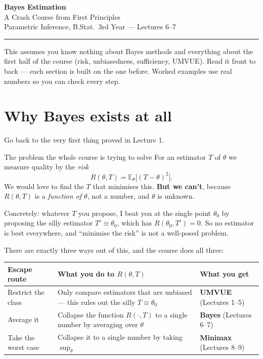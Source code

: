 \documentclass[11pt]{article}
\newcommand{\E}{\mathbb{E}}
\begin{document}
\begin{center}
{\LARGE\bfseries Bayes Estimation}\\[3pt]
{\large A Crash Course from First Principles}\\[5pt]
{\small Parametric Inference, B.Stat.\ 3rd Year --- Lectures 6--7}
\end{center}

\vspace{4pt}\hrule\vspace{10pt}

\noindent
This assumes you know nothing about Bayes methods and everything about the first half of the
course (risk, unbiasedness, sufficiency, UMVUE). Read it front to back --- each section is
built on the one before. Worked examples use real numbers so you can check every step.

\tableofcontents

\section{Why Bayes exists at all}

Go back to the very first thing proved in Lecture 1.

\begin{idea}{The problem the whole course is trying to solve}
For an estimator $T$ of $\theta$ we measure quality by the \emph{risk}
\[
R(\theta,T)=\E_\theta\big[(T-\theta)^2\big].
\]
We would love to find the $T$ that minimises this. \textbf{But we can't}, because
$R(\theta,T)$ is a \emph{function of $\theta$}, not a number, and $\theta$ is unknown.

Concretely: whatever $T$ you propose, I beat you at the single point $\theta_0$ by proposing
the silly estimator $T'\equiv\theta_0$, which has $R(\theta_0,T')=0$. So no estimator is best
everywhere, and ``minimise the risk'' is not a well-posed problem.
\end{idea}

There are exactly three ways out of this, and the course does all three:

\begin{center}
\renewcommand{\arraystretch}{1.4}
\begin{tabular}{@{}p{3.3cm}p{5.4cm}p{6.8cm}@{}}
\toprule
\textbf{Escape route} & \textbf{What you do to $R(\theta,T)$} & \textbf{What you get} \\
\midrule
Restrict the class & Only compare estimators that are unbiased --- this rules out the silly
$T\equiv\theta_0$ & \textbf{UMVUE} (Lectures 1--5) \\
Average it & Collapse the function $R(\cdot,T)$ to a single number by averaging over $\theta$
& \textbf{Bayes} (Lectures 6--7) \\
Take the worst case & Collapse it to a single number by taking $\sup_\theta$ &
\textbf{Minimax} (Lectures 8--9) \\
\bottomrule
\end{tabular}
\end{center}
\end{document}
